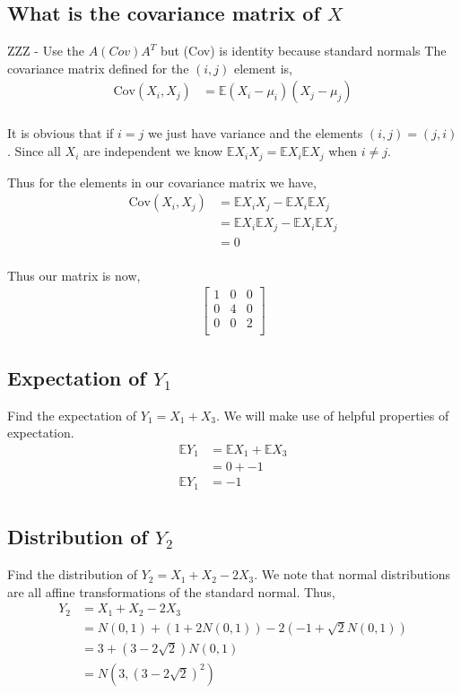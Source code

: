 \documentclass{article}
\newcommand{\expect}{\mathbb{E}}
\begin{document}
\subsection{What is the covariance matrix of $X$}
ZZZ - Use the $A (Cov) A^T$ but (Cov) is identity because standard normals
The covariance matrix defined for the $(i,j)$ element is,
\begin{align*}
    \text{Cov}(X_i,X_j) & = \expect (X_i - \mu_i)(X_j - \mu_j) \\
\end{align*}

It is obvious that if $i = j$ we just have variance and the elements
$(i, j) = (j ,i)$. Since all $X_i$ are independent we know
$\expect X_i X_j = \expect X_i \expect X_j$ when $i \neq j$.

Thus for the elements in our covariance matrix we have,
\begin{align*}
    \text{Cov}(X_i,X_j) & = \expect X_i X_j - \expect X_i \expect X_j \\
    & = \expect X_i \expect X_j - \expect X_i \expect X_j \\
    & = 0 \\
\end{align*}

Thus our matrix is now,
\begin{align*}
    \begin{bmatrix}
        1 & 0 & 0 \\
        0 & 4 & 0 \\
        0 & 0 & 2 \\
    \end{bmatrix}
\end{align*}

\subsection{Expectation of $Y_1$}
Find the expectation of $Y_1 = X_1 + X_3$. We will make use of helpful
properties of expectation.
\begin{align*}
    \expect Y_1 &= \expect X_1 + \expect X_3 \\
    &= 0 + -1 \\
    \expect Y_1 &= -1 \\
\end{align*}

\subsection{Distribution of $Y_2$}
Find the distribution of $Y_2 = X_1 + X_2 - 2X_3$. We note that normal
distributions are all affine transformations of the standard normal. Thus,
\begin{align*}
    Y_2 &= X_1 + X_2 - 2X_3 \\
    &= N(0,1) + (1 + 2 N(0,1)) - 2(-1 + \sqrt{2} N(0,1)) \\
    &= 3 + (3 - 2\sqrt{2}) N(0,1) \\
    &= N(3, (3-2\sqrt{2})^2) \\
\end{align*}
\end{document}

